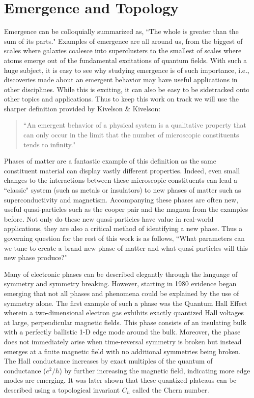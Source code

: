 \section{Emergence and Topology}
Emergence can be colloquially summarized as, ``The whole is greater than the sum of its parts." Examples of emergence are all around us, from the biggest of scales where galaxies coalesce into superclusters to the smallest of scales where atoms emerge out of the fundamental excitations of quantum fields. With such a huge subject, it is easy to see why studying emergence is of such importance, i.e., discoveries made about an emergent behavior may have useful applications in other disciplines. While this is exciting, it can also be easy to be sidetracked onto other topics and applications. Thus to keep this work on track we will use the sharper definition provided by Kivelson \& Kivelson:
\begin{quote}
	``An emergent behavior of a physical system is a qualitative property that can only occur in the limit that the number of microscopic constituents tends to infinity."\cite{Kivelson2016}
\end{quote}
Phases of matter are a fantastic example of this definition as the same constituent material can display vastly different properties. Indeed, even small changes to the interactions between these microscopic constituents can lead a ``classic" system (such as metals or insulators) to new phases of matter such as superconductivity and magnetism. Accompanying these phases are often new, useful quasi-particles such as the cooper pair and the magnon from the examples before. Not only do these new quasi-particles have value in real-world applications, they are also a critical method of identifying a new phase. Thus a governing question for the rest of this work is as follows, ``What parameters can we tune to create a brand new phase of matter and what quasi-particles will this new phase produce?"
\par 
Many of electronic phases can be described elegantly through the language of symmetry and symmetry breaking\cite{Noether1918, Landau1937, pathria_beale_2022}. However, starting in 1980 evidence began emerging that not all phases and phenomena could be explained by the use of symmetry alone. The first example of such a phase was the Quantum Hall Effect wherein a two-dimensional electron gas exhibits exactly quantized Hall voltages at large, perpendicular magnetic fields\cite{Klitzing1980}. This phase consists of an insulating bulk with a perfectly ballistic 1-D edge mode around the bulk. Moreover, the phase does not immediately arise when time-reversal symmetry is broken but instead emerges at a finite magnetic field with no additional symmetries being broken. The Hall conductance increases by exact multiples of the quantum of conductance ($e^{2}/h$) by further increasing the magnetic field, indicating more edge modes are emerging\cite{Zhang2005}. It was later shown that these quantized plateaus can be described using a topological invariant $C_{n}$ called the Chern number.\cite{Thouless1982, Kohmoto1985, Avron1983, Niu1985}\par 
